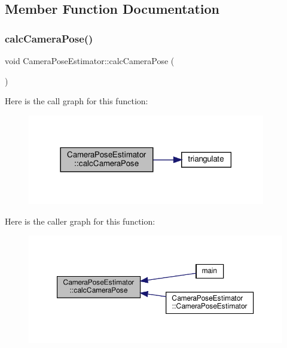 \subsection{Member Function Documentation}
\mbox{\label{classCameraPoseEstimator_a2ffa3353dc0ca9913a35c3c018cf19da}} 
\subsubsection{\texorpdfstring{calc\+Camera\+Pose()}{calcCameraPose()}}
{\footnotesize\ttfamily void Camera\+Pose\+Estimator\+::calc\+Camera\+Pose (\begin{DoxyParamCaption}{ }\end{DoxyParamCaption})}

Here is the call graph for this function\+:\nopagebreak
\begin{figure}[H]
\begin{center}
\leavevmode
\includegraphics[width=294pt]{classCameraPoseEstimator_a2ffa3353dc0ca9913a35c3c018cf19da_cgraph}
\end{center}
\end{figure}
Here is the caller graph for this function\+:\nopagebreak
\begin{figure}[H]
\begin{center}
\leavevmode
\includegraphics[width=350pt]{classCameraPoseEstimator_a2ffa3353dc0ca9913a35c3c018cf19da_icgraph}
\end{center}
\end{figure}
\mbox{\label{classCameraPoseEstimator_ac1b95d78d7d3f4c8032d8e494034420c}} 
